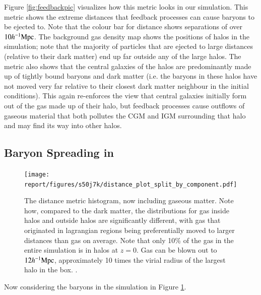 Figure \ref{fig:feedbackpic} visualizes how this metric looks in our \simba{}
simulation. This metric shows the extreme distances that feedback processes
can cause baryons to be ejected to. Note that the colour bar for distance
shows separations of over $10h^{-1}{\rm Mpc}{}$. The background gas density map shows
the positions of halos in the simulation; note that the majority of particles
that are ejected to large distances (relative to their dark matter) end up
far outside any of the large halos. The metric also shows that the central
galaxies of the halos are predominantly made up of tightly bound baryons and
dark matter (i.e. the baryons in these halos have not moved very far relative
to their closest dark matter neighbour in the initial conditions). This again
re-enforces the view that central galaxies initially form out of the gas made
up of their halo, but feedback processes cause outflows of gaseous material
that both pollutes the CGM and IGM surrounding that halo and may find its way
into other halos.

\subsection{Baryon Spreading in \simba{}}

\begin{figure}
    \centering
    \texttt{[image: report/figures/s50j7k/distance\_plot\_split\_by\_component.pdf]}
    \vspace{-0.5cm}
    \caption{The distance metric histogram, now including gaseous matter. Note how,
    compared to the dark matter, the distributions for gas inside halos and outside
    halos are significantly different, with gas that originated in lagrangian regions
    being preferentially moved to larger distances than gas on average. Note that only
    10\% of the gas in the entire simulation is in halos at $z=0$. Gas can be blown
    out to $12h^{-1}{\rm Mpc}{}$, approximately 10 times the virial radius of the largest halo
    in the box.
    .}
    \vspace{-0.5cm}
    \label{fig:distbaryon}
\end{figure}

Now considering the baryons in the simulation in Figure \ref{fig:distbaryon}.

